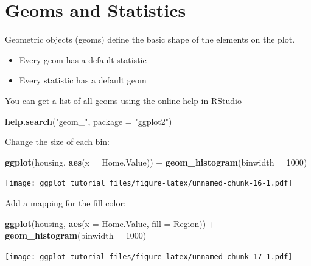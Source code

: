 \documentclass[]{article}
\newenvironment{Shaded}{\begin{snugshade}}{\end{snugshade}}
\newcommand{\KeywordTok}[1]{\textcolor[rgb]{0.13,0.29,0.53}{\textbf{{#1}}}}
\newcommand{\DataTypeTok}[1]{\textcolor[rgb]{0.13,0.29,0.53}{{#1}}}
\newcommand{\DecValTok}[1]{\textcolor[rgb]{0.00,0.00,0.81}{{#1}}}
\newcommand{\StringTok}[1]{\textcolor[rgb]{0.31,0.60,0.02}{{#1}}}
\newcommand{\NormalTok}[1]{{#1}}
\providecommand{\tightlist}{%
  \setlength{\itemsep}{0pt}\setlength{\parskip}{0pt}}
\theoremstyle{definition}
\theoremstyle{definition}
\theoremstyle{definition}
\theoremstyle{remark}
\begin{document}
\section{Geoms and Statistics}\label{geoms-and-statistics}

Geometric objects (geoms) define the basic shape of the elements on the
plot.

\begin{itemize}
\tightlist
\item
  Every geom has a default statistic
\item
  Every statistic has a default geom
\end{itemize}

You can get a list of all geoms using the online help in RStudio

\begin{Shaded}
\begin{Highlighting}[]
\KeywordTok{help.search}\NormalTok{(}\StringTok{"geom_"}\NormalTok{, }\DataTypeTok{package =} \StringTok{"ggplot2"}\NormalTok{)}
\end{Highlighting}
\end{Shaded}

Change the size of each bin:

\begin{Shaded}
\begin{Highlighting}[]
\KeywordTok{ggplot}\NormalTok{(housing, }\KeywordTok{aes}\NormalTok{(}\DataTypeTok{x =} \NormalTok{Home.Value)) +}
\StringTok{  }\KeywordTok{geom_histogram}\NormalTok{(}\DataTypeTok{binwidth =} \DecValTok{1000}\NormalTok{)}
\end{Highlighting}
\end{Shaded}

\texttt{[image: ggplot\_tutorial\_files/figure-latex/unnamed-chunk-16-1.pdf]}

Add a mapping for the fill color:

\begin{Shaded}
\begin{Highlighting}[]
\KeywordTok{ggplot}\NormalTok{(housing, }\KeywordTok{aes}\NormalTok{(}\DataTypeTok{x =} \NormalTok{Home.Value, }\DataTypeTok{fill =} \NormalTok{Region)) +}
\StringTok{  }\KeywordTok{geom_histogram}\NormalTok{(}\DataTypeTok{binwidth =} \DecValTok{1000}\NormalTok{)}
\end{Highlighting}
\end{Shaded}

\texttt{[image: ggplot\_tutorial\_files/figure-latex/unnamed-chunk-17-1.pdf]}
\end{document}
